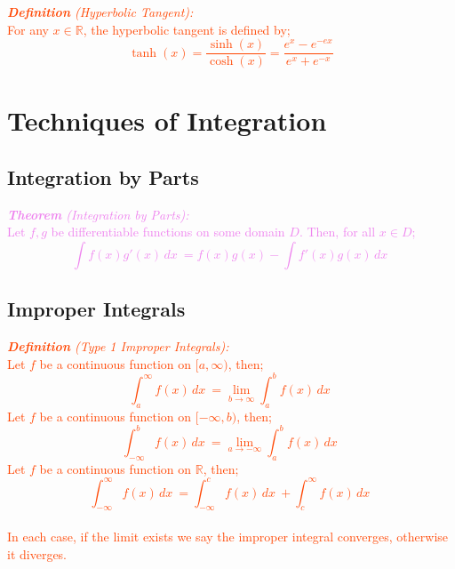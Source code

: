 \documentclass{report}
\newenvironment{definition}[1][OrangeRed]
  {\begin{tcolorbox}[colframe=#1,colback=white]}
  {\end{tcolorbox}}
\newenvironment{theorem}[1][Violet]
  {\begin{tcolorbox}[colframe=#1,colback=white]}
  {\end{tcolorbox}}
\begin{document}
\begin{definition}
    \textcolor{OrangeRed}{\textit{\textbf{Definition} (Hyperbolic Tangent):}\\
    For any $x \in \mathbb{R}$, the hyperbolic tangent is defined by;
    \begin{equation}
    \tanh{(x)} = \frac{\sinh{(x)}}{\cosh{(x)}} = \frac{e^x - e^{-ex}}{e^x+e^{-x}}
    \end{equation}}
\end{definition}

\chapter{Techniques of Integration}
\section{Integration by Parts}

\begin{theorem}
    \textcolor{Violet}{\textit{\textbf{Theorem} (Integration by Parts): }\\
    Let $f,g$ be differentiable functions on some domain $D$. Then, for all $x \in D$;
    \begin{equation}
        \int f(x)g'(x) \,dx\ = f(x)g(x) - \int f'(x) g(x) \,dx\
    \end{equation}}
\end{theorem}

\section{Improper Integrals}

\begin{definition}
    \textcolor{OrangeRed}{\textit{\textbf{Definition} (Type 1 Improper Integrals):}\\
    Let $f$ be a continuous function on $[a,\infty)$, then;
    \begin{equation}
        \int_a^\infty f(x) \,dx\ = \lim_{b \longrightarrow \infty} \int_a^b f(x) \,dx\
    \end{equation}
    Let $f$ be a continuous function on $[-\infty, b)$, then;
    \begin{equation}
        \int_{-\infty}^b f(x) \,dx\ = \lim_{a \longrightarrow -\infty} \int_a^b f(x) \,dx\
    \end{equation}
    Let $f$ be a continuous function on $\mathbb{R}$, then;
    \begin{equation}
        \int_{-\infty}^\infty f(x) \,dx\ = \int_{-\infty}^c f(x) \,dx\ + \int_c^\infty f(x) \,dx\
    \end{equation}
    \rightline{for any $c \in \mathbb{R}$.}\\
    In each case, if the limit exists we say the improper integral converges, otherwise it diverges.}
    
\end{definition}
\end{document}
